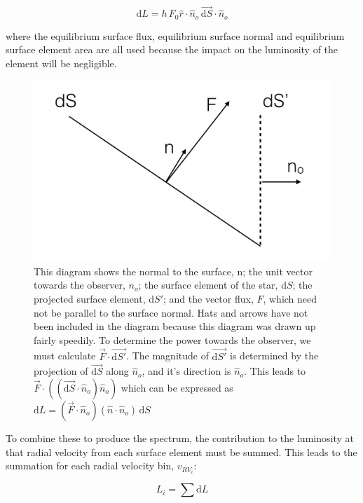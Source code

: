 \documentclass[11pt]{amsart}
\begin{document}
\begin{equation}
\text{d}L = h \, F_{0} \hat{r} \cdot \hat{n}_{o} \, \vec{\text{d}S} \! \cdot \! \hat{n}_{o}
\end{equation}

where the equilibrium surface flux, equilibrium surface normal and equilibrium surface element area are all used because the impact on the luminosity of the element will be negligible.

\begin{figure}
\begin{center}
\includegraphics[width = 0.75 \textwidth]{flux_diagram.png}
\caption{This diagram shows the normal to the surface, n; the unit vector towards the observer, $n_{o}$; the surface element of the star, d$S$; the projected surface element, d$S'$; and the vector flux, $F$, which need not be parallel to the surface normal.  Hats and arrows have not been included in the diagram because this diagram was drawn up fairly speedily.  To determine the power towards the observer, we must calculate $\vec{F} \! \cdot \! \vec{\text{d} S'}$.  The magnitude of $\vec{\text{d} S'}$ is determined by the projection of $\vec{\text{d} S}$ along $\hat{n}_{o}$, and it's direction is $\hat{n}_{o}$.  This leads to $\vec{F} \cdot ( (\vec{\text{d} S} \cdot \hat{n}_{o}) \hat{n}_{o} )$ which can be expressed as $\text{d}L = ( \vec{F} \cdot \hat{n}_{o})   (\hat{n} \cdot \hat{n}_{o}) \, \text{d} S$}
\label{fig:flux_diagram}
\end{center}
\end{figure}

To combine these to produce the spectrum, the contribution to the luminosity at that radial velocity from each surface element must be summed.  This leads to the summation for each radial velocity bin, $v_{RV_{i}}$:

\begin{equation}
L_{i} = \sum \text{d}L
\end{equation}
\end{document}
